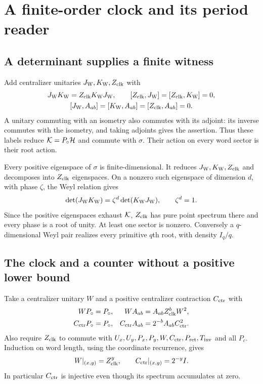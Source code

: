 \section{A finite-order clock and its period reader}\label{sec:clock}
\subsection{A determinant supplies a finite witness}
Add centralizer unitaries $J_{\rm W},K_{\rm W},Z_{\rm clk}$ with
\begin{equation}\label{eq:weyl}
\begin{gathered}
 J_{\rm W}K_{\rm W}=Z_{\rm clk}K_{\rm W}J_{\rm W},\qquad
 [Z_{\rm clk},J_{\rm W}]=[Z_{\rm clk},K_{\rm W}]=0,\\
 [J_{\rm W},A_{ab}]=[K_{\rm W},A_{ab}]=[Z_{\rm clk},A_{ab}]=0.
\end{gathered}
\end{equation}
A unitary commuting with an isometry also commutes with its adjoint: its inverse commutes with the isometry, and taking adjoints gives the assertion. Thus these labels reduce $\mathcal K=P_{\circ}\mathcal H$ and commute with $\sigma$. Their action on every word sector is their root action.

Every positive eigenspace of $\sigma$ is finite-dimensional. It reduces $J_{\rm W},K_{\rm W},Z_{\rm clk}$ and decomposes into $Z_{\rm clk}$ eigenspaces. On a nonzero such eigenspace of dimension $d$, with phase $\zeta$, the Weyl relation gives
\begin{equation}\label{eq:det}
 \det(J_{\rm W}K_{\rm W})=\zeta^d\det(K_{\rm W}J_{\rm W}),\qquad \zeta^d=1.
\end{equation}
Since the positive eigenspaces exhaust $\mathcal K$, $Z_{\rm clk}$ has pure point spectrum there and every phase is a root of unity. At least one sector is nonzero. Conversely a $q$-dimensional Weyl pair realizes every primitive $q$th root, with density $I_q/q$.

\subsection{The clock and a counter without a positive lower bound}
Take a centralizer unitary $W$ and a positive centralizer contraction $C_{\rm ctr}$ with
\begin{align}
 WP_{\circ}&=P_{\circ},&WA_{ab}&=A_{ab}Z_{\rm clk}^bW^2,\label{eq:W}\\
 C_{\rm ctr}P_{\circ}&=P_{\circ},&C_{\rm ctr}A_{ab}&=2^{-b}A_{ab}C_{\rm ctr}^2.\label{eq:C}
\end{align}
Also require $Z_{\rm clk}$ to commute with $U_x,U_y,P_x,P_y,W,C_{\rm ctr},P_{\rm ret},T_{\rm inv}$ and all $P_c$. Induction on word length, using the coordinate recurrence, gives
\begin{equation}\label{eq:coordinateclock}
 W|_{(x,y)}=Z_{\rm clk}^y,\qquad C_{\rm ctr}|_{(x,y)}=2^{-y}I.
\end{equation}
In particular $C_{\rm ctr}$ is injective even though its spectrum accumulates at zero.

